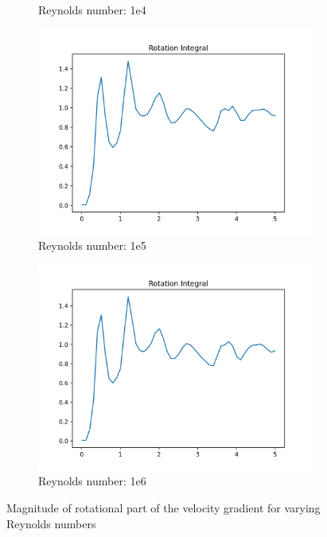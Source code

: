 \documentclass[a4paper,12pt]{article}
\begin{document}
\begin{figure}
\begin{subfigure}[b]{0.45\textwidth}
         \caption{Reynolds number: 1e4}
         \label{fig:re10000-rs64-2}
     \end{subfigure}
     \hfill
     \begin{subfigure}[b]{0.45\textwidth}
         \centering
         \includegraphics[width=\textwidth]{imgs/results-KHI-RE100000.0-RSL64-rr_integral}
         \caption{Reynolds number: 1e5}
         \label{fig:re100000-rs64}
     \end{subfigure}
     \hfill
     \begin{subfigure}[b]{0.45\textwidth}
         \centering
         \includegraphics[width=\textwidth]{imgs/results-KHI-RE1000000.0-RSL64-rr_integral}
         \caption{Reynolds number: 1e6}
         \label{fig:re1000000-rs64}
     \end{subfigure}
     \caption{Magnitude of rotational part of the velocity gradient for varying Reynolds numbers}
     \label{fig:rr-reynoldnumber}
\end{figure}
\end{document}

